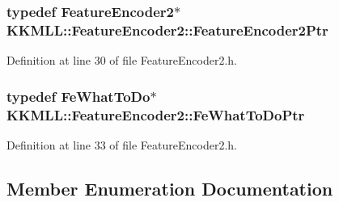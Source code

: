 \subsubsection[{\texorpdfstring{Feature\+Encoder2\+Ptr}{FeatureEncoder2Ptr}}]{\setlength{\rightskip}{0pt plus 5cm}typedef {\bf Feature\+Encoder2}$\ast$ {\bf K\+K\+M\+L\+L\+::\+Feature\+Encoder2\+::\+Feature\+Encoder2\+Ptr}}\hypertarget{class_k_k_m_l_l_1_1_feature_encoder2_a532ca948bcdc2c2bf3ccbce7f323a8a9}{}\label{class_k_k_m_l_l_1_1_feature_encoder2_a532ca948bcdc2c2bf3ccbce7f323a8a9}


Definition at line 30 of file Feature\+Encoder2.\+h.

\subsubsection[{\texorpdfstring{Fe\+What\+To\+Do\+Ptr}{FeWhatToDoPtr}}]{\setlength{\rightskip}{0pt plus 5cm}typedef {\bf Fe\+What\+To\+Do}$\ast$ {\bf K\+K\+M\+L\+L\+::\+Feature\+Encoder2\+::\+Fe\+What\+To\+Do\+Ptr}}\hypertarget{class_k_k_m_l_l_1_1_feature_encoder2_a0d93f1765b83a213a2269185fc66bf97}{}\label{class_k_k_m_l_l_1_1_feature_encoder2_a0d93f1765b83a213a2269185fc66bf97}


Definition at line 33 of file Feature\+Encoder2.\+h.



\subsection{Member Enumeration Documentation}
